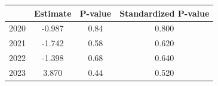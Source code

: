 \begin{tabular}{lccc}
\hline
 & Estimate & P-value & Standardized P-value \\
\hline
2020 & -0.987 & 0.84 & 0.800 \\
2021 & -1.742 & 0.58 & 0.620 \\
2022 & -1.398 & 0.68 & 0.640 \\
2023 & 3.870 & 0.44 & 0.520 \\
\hline
\end{tabular}

